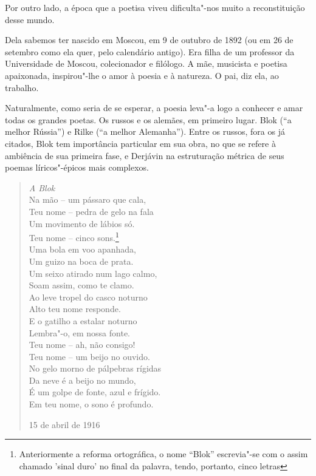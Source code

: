 Por outro lado, a época que a poetisa viveu dificulta"-nos muito a
reconstituição desse mundo.

Dela sabemos ter nascido em Moscou, em 9 de outubro de 1892 (ou em 26 de
setembro como ela quer, pelo calendário antigo). Era filha de um
professor da Universidade de Moscou, colecionador e filólogo. A mãe,
musicista e poetisa apaixonada, inspirou"-lhe o amor à poesia e à
natureza. O pai, diz ela, ao trabalho.

Naturalmente, como seria de se esperar, a poesia leva"-a logo a conhecer
e amar todas os grandes poetas. Os russos e os alemães, em primeiro
lugar. Blok (``a melhor Rússia'') e Rilke (``a melhor Alemanha''). Entre
os russos, fora os já citados, Blok tem importância particular em sua
obra, no que se refere à ambiência de sua primeira fase, e Derjávin na
estruturação métrica de seus poemas líricos"-épicos mais complexos.

\begin{verse}
\emph{A Blok} \\[8pt]
Na mão -- um pássaro que cala, \\
Teu nome -- pedra de gelo na fala \\
Um movimento de lábios só. \\[8pt]
Teu nome -- cinco sons.\footnote{Anteriormente a reforma ortográfica, o
  nome ``Blok'' escrevia"-se com o assim chamado 'sinal duro' no final da
  palavra, tendo, portanto, cinco letras} \\
Uma bola em voo apanhada, \\
Um guizo na boca de prata. \\
Um seixo atirado num lago calmo, \\
Soam assim, como te clamo. \\
Ao leve tropel do casco noturno \\
Alto teu nome responde. \\
E o gatilho a estalar noturno \\
Lembra"-o, em nossa fonte. \\[8pt]
Teu nome -- ah, não consigo! \\
Teu nome -- um beijo no ouvido. \\
No gelo morno de pálpebras rígidas \\
Da neve é a beijo no mundo, \\
É um golpe de fonte, azul e frígido. \\
Em teu nome, o sono é profundo. 
\begin{flushright}
15 de abril de 1916
\end{flushright}
\end{verse}


